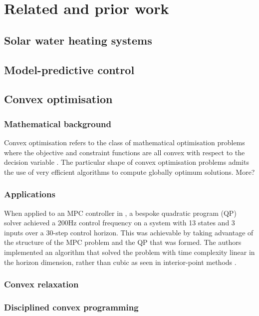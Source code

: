 \chapter{Related and prior work}

\section{Solar water heating systems}

\section{Model-predictive control}

\section{Convex optimisation}

\subsection{Mathematical background}

Convex optimisation refers to the class of mathematical optimisation problems where the objective and constraint functions are all convex with respect to the decision variable \cite{Boyd04}.
The particular shape of convex optimisation problems admits the use of very efficient algorithms to compute globally optimum solutions.
More?

\subsection{Applications}

When applied to an MPC controller in \cite{Wang10}, a bespoke quadratic program (QP) solver achieved a 200Hz control frequency on a system with 13 states and 3 inputs over a 30-step control horizon.
This was achievable by taking advantage of the structure of the MPC problem and the QP that was formed.
The authors implemented an algorithm that solved the problem with time complexity linear in the horizon dimension, rather than cubic as seen in interior-point methods \cite{}.

\subsection{Convex relaxation}

\subsection{Disciplined convex programming}

